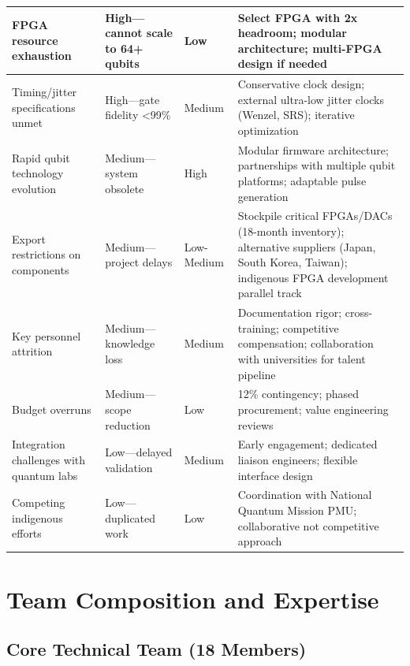 \documentclass[12pt,a4paper]{article}
\begin{document}
\begin{enumerate}[leftmargin=*]
\begin{longtable}{@{}p{3.5cm}p{4cm}p{3cm}p{4cm}@{}}
FPGA resource exhaustion & High—cannot scale to 64+ qubits & Low & Select FPGA with 2x headroom; modular architecture; multi-FPGA design if needed \\
\midrule

Timing/jitter specifications unmet & High—gate fidelity <99\% & Medium & Conservative clock design; external ultra-low jitter clocks (Wenzel, SRS); iterative optimization \\
\midrule

Rapid qubit technology evolution & Medium—system obsolete & High & Modular firmware architecture; partnerships with multiple qubit platforms; adaptable pulse generation \\
\midrule

Export restrictions on components & Medium—project delays & Low-Medium & Stockpile critical FPGAs/DACs (18-month inventory); alternative suppliers (Japan, South Korea, Taiwan); indigenous FPGA development parallel track \\
\midrule

Key personnel attrition & Medium—knowledge loss & Medium & Documentation rigor; cross-training; competitive compensation; collaboration with universities for talent pipeline \\
\midrule

Budget overruns & Medium—scope reduction & Low & 12\% contingency; phased procurement; value engineering reviews \\
\midrule

Integration challenges with quantum labs & Low—delayed validation & Medium & Early engagement; dedicated liaison engineers; flexible interface design \\
\midrule

Competing indigenous efforts & Low—duplicated work & Low & Coordination with National Quantum Mission PMU; collaborative not competitive approach \\
\bottomrule
\end{longtable}

\newpage

\section{Team Composition and Expertise}

\subsection{Core Technical Team (18 Members)}


\end{enumerate}
\end{document}
